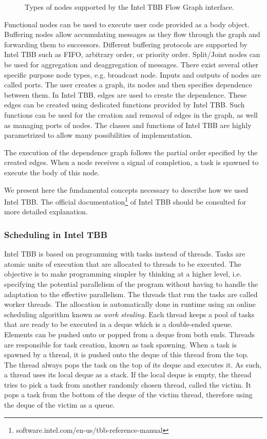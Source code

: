\begin{figure}[phbt]
\centering

\caption{Types of nodes supported by the Intel TBB Flow Graph interface.}
\label{fig:tbbnodes}
\end{figure}

Functional nodes can be used to execute user code provided as a body object. Buffering nodes allow accumulating messages as they flow through the graph and forwarding them to successors. Different buffering protocols are supported by Intel TBB such as FIFO, arbitrary order, or priority order. Split/Joint nodes can be used for aggregation and deaggregation of messages. There exist several other specific purpose node types, e.g. broadcast node. Inputs and outputs of nodes are called ports. %
The user creates a graph, its nodes and then specifies dependence between them. In Intel TBB, edges are used to create the dependence. These edges can be created using dedicated functions provided by Intel TBB. Such functions can be used for the creation and removal of edges in the graph, as well as managing ports of nodes.
The classes and functions of Intel TBB are highly parametrized to allow many possibilities of implementation.

The execution of the dependence graph follows the partial order specified by the created edges. When a node receives a signal of completion, a task is spawned to execute the body of this node. 

We present here the fundamental concepts necessary to describe how we used Intel TBB. The official documentation\footnote{software.intel.com/en-us/tbb-reference-manual} of Intel TBB should be consulted for more detailed explanation. 


\subsubsection{Scheduling in Intel TBB}

Intel TBB is based on programming with tasks instead of threads. Tasks are atomic units of execution that are allocated to threads to be executed. The objective is to make programming simpler by thinking at a higher level, i.e. specifying the potential parallelism of the program without having to handle the adaptation to the effective parallelism. The threads that run the tasks are called worker threads. The allocation is automatically done in runtime using an online scheduling algorithm known as \textit{work stealing}. Each thread keeps a pool of tasks that are ready to be executed in a deque which is a double-ended queue. Elements can be pushed onto or popped from a deque from both ends. Threads are responsible for task creation, known as task spawning. When a task is spawned by a thread, it is pushed onto the deque of this thread from the top. The thread always pops the task on the top of its deque and executes it. As such, a thread uses its local deque as a stack. If the local deque is empty, the thread tries to pick a task from another randomly chosen thread, called the victim. It pops a task from the bottom of the deque of the victim thread, therefore using the deque of the victim as a queue.

